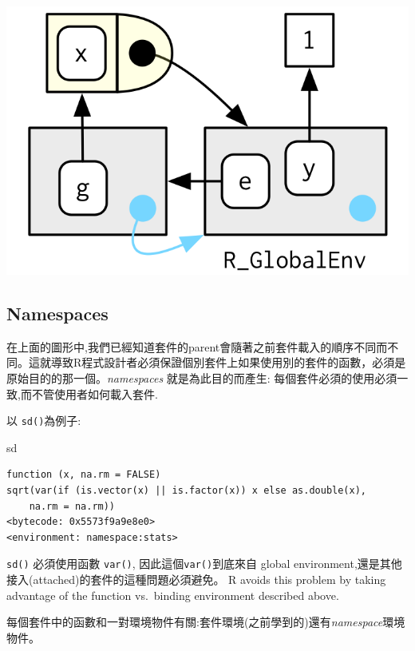 \documentclass[]{book}
\newenvironment{Shaded}{\begin{snugshade}}{\end{snugshade}}
\newcommand{\NormalTok}[1]{#1}
\theoremstyle{definition}
\theoremstyle{definition}
\theoremstyle{definition}
\theoremstyle{remark}
\begin{document}
\begin{center}\includegraphics{diagrams/environments/binding-2} \end{center}

\hypertarget{namespaces}{%
\subsection{Namespaces}\label{namespaces}}

在上面的圖形中,我們已經知道套件的parent會隨著之前套件載入的順序不同而不同。這就導致R程式設計者必須保證個別套件上如果使用別的套件的函數，必須是原始目的的那一個。\emph{namespaces}
就是為此目的而產生: 每個套件必須的使用必須一致,而不管使用者如何載入套件.

以 \texttt{sd()}為例子:

\begin{Shaded}
\begin{Highlighting}[]
\NormalTok{sd}
\end{Highlighting}
\end{Shaded}

\begin{verbatim}
function (x, na.rm = FALSE) 
sqrt(var(if (is.vector(x) || is.factor(x)) x else as.double(x), 
    na.rm = na.rm))
<bytecode: 0x5573f9a9e8e0>
<environment: namespace:stats>
\end{verbatim}

\texttt{sd()} 必須使用函數 \texttt{var()},
因此這個\texttt{var()}到底來自 global
environment,還是其他接入(attached)的套件的這種問題必須避免。 R avoids
this problem by taking advantage of the function vs.~binding environment
described above.

每個套件中的函數和一對環境物件有關:套件環境(之前學到的)還有\emph{namespace}環境物件。
\end{document}
